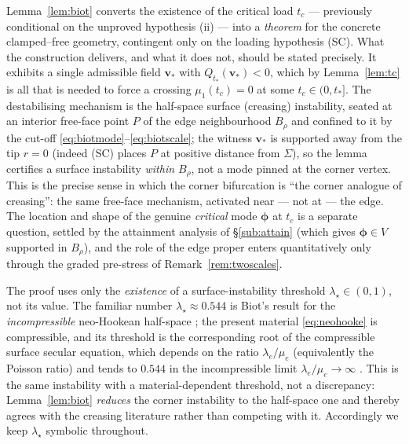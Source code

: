 \begin{remark}
    Lemma~\ref{lem:biot} converts the existence of the critical load $t_c$ --- previously conditional on the unproved
    hypothesis (ii) --- into a \emph{theorem} for the concrete clamped--free geometry, contingent only on the loading
    hypothesis (SC). What the construction delivers, and what it does not, should be stated precisely. It exhibits a
    single admissible field $\bm{v}_*$ with $Q_{t_*}(\bm{v}_*)<0$, which by Lemma~\ref{lem:tc} is all that is needed to
    force a crossing $\mu_1(t_c)=0$ at some $t_c\in(0,t_*]$. The destabilising mechanism is the half-space surface
    (creasing) instability, seated at an interior free-face point $P$ of the edge neighbourhood $B_\rho$ and confined to
    it by the cut-off \eqref{eq:biotmode}--\eqref{eq:biotscale}; the witness $\bm{v}_*$ is supported away from the tip
    $r=0$ (indeed (SC) places $P$ at positive distance from $\Sigma$), so the lemma certifies a surface instability
    \emph{within $B_\rho$}, not a mode pinned at the corner vertex. This is the precise sense in which the corner
    bifurcation is ``the corner analogue of creasing'': the same free-face mechanism, activated near --- not at --- the
    edge. The location and shape of the genuine \emph{critical} mode $\bm{\phi}$ at $t_c$ is a separate question,
    settled by the attainment analysis of \S\ref{sub:attain} (which gives $\bm{\phi}\in V$ supported in $B_\rho$), and
    the role of the edge proper enters quantitatively only through the graded pre-stress of Remark~\ref{rem:twoscales}.
\end{remark}

\begin{remark}
    \label{rem:threshold}
    The proof uses only the \emph{existence} of a surface-instability threshold $\lambda_\star\in(0,1)$, not its value.
    The familiar number $\lambda_\star\approx0.544$ is Biot's result for the \emph{incompressible} neo-Hookean half-space
    \cite{Biot1963}; the present material \eqref{eq:neohooke} is compressible, and its threshold is the corresponding root
    of the compressible surface secular equation, which depends on the ratio $\lambda_e/\mu_e$ (equivalently the Poisson
    ratio) and tends to $0.544$ in the incompressible limit $\lambda_e/\mu_e\to\infty$ \cite{Hong2009}. This is the same
    instability with a material-dependent threshold, not a discrepancy: Lemma~\ref{lem:biot} \emph{reduces} the corner
    instability to the half-space one and thereby agrees with the creasing literature rather than competing with it.
    Accordingly we keep $\lambda_\star$ symbolic throughout.
\end{remark}

